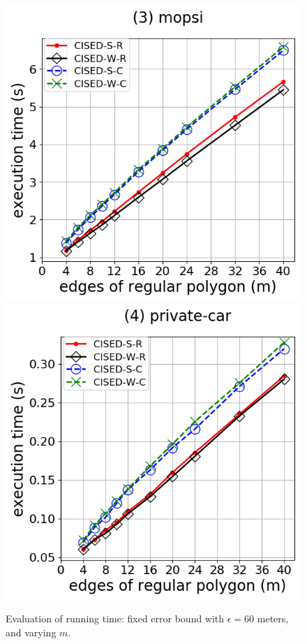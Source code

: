 \begin{figure}[tb!]
	\includegraphics[scale = 0.30]{Figures/Exp-M-e-60-time-mopsi.png}
	\includegraphics[scale = 0.30]{Figures/Exp-M-e-60-time-private.png}
	\caption{\small Evaluation of running time: fixed error bound with $\epsilon=60$ meters, and varying $m$. }
	\label{fig:m-time-e60}
\end{figure}



